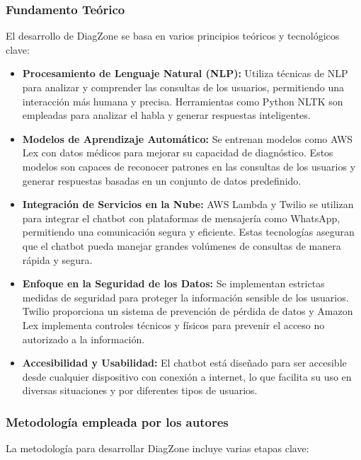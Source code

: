 \subsubsection{Fundamento Teórico}
El desarrollo de DiagZone se basa en varios principios teóricos y tecnológicos clave:

\begin{itemize}
	\item \textbf{Procesamiento de Lenguaje Natural (NLP):} Utiliza técnicas de NLP para analizar y comprender las consultas de los usuarios, permitiendo una interacción más humana y precisa. Herramientas como Python NLTK son empleadas para analizar el habla y generar respuestas inteligentes.
		
	\item \textbf{Modelos de Aprendizaje Automático:} Se entrenan modelos como AWS Lex con datos médicos para mejorar su capacidad de diagnóstico. Estos modelos son capaces de reconocer patrones en las consultas de los usuarios y generar respuestas basadas en un conjunto de datos predefinido.
	
	\item \textbf{Integración de Servicios en la Nube:} AWS Lambda y Twilio se utilizan para integrar el chatbot con plataformas de mensajería como WhatsApp, permitiendo una comunicación segura y eficiente. Estas tecnologías aseguran que el chatbot pueda manejar grandes volúmenes de consultas de manera rápida y segura.
	
	\item \textbf{Enfoque en la Seguridad de los Datos:} Se implementan estrictas medidas de seguridad para proteger la información sensible de los usuarios. Twilio proporciona un sistema de prevención de pérdida de datos y Amazon Lex implementa controles técnicos y físicos para prevenir el acceso no autorizado a la información.
	
	\item \textbf{Accesibilidad y Usabilidad:} El chatbot está diseñado para ser accesible desde cualquier dispositivo con conexión a internet, lo que facilita su uso en diversas situaciones y por diferentes tipos de usuarios.
\end{itemize}

\subsubsection{Metodología empleada por los autores}
La metodología para desarrollar DiagZone incluye varias etapas clave:

